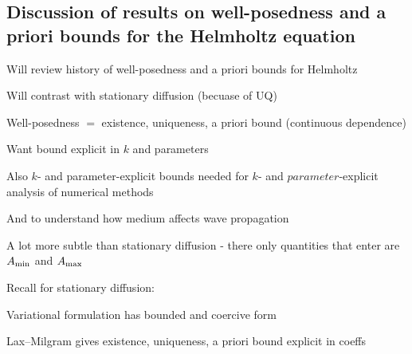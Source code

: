 \subsection{Discussion of results on well-posedness and a priori bounds for the Helmholtz equation}
\bit
\item Will review history of well-posedness and a priori bounds for Helmholtz
\item Will contrast with stationary diffusion (becuase of UQ)
  \eit

  \bit
\item Well-posedness $=$ existence, uniqueness, a priori bound (continuous dependence)
\item Want bound explicit in $k$ and parameters
  \item Also $k$- and parameter-explicit bounds needed for $k$- and $parameter$-explicit analysis of numerical methods
  \item And to understand how medium affects wave propagation
    \item A lot more subtle than stationary diffusion - there only quantities that enter are $A_{\min}$ and $A_{\max}$
  \eit

Recall for stationary diffusion:
\bit
\item Variational formulation has bounded and coercive form
\item Lax--Milgram gives existence, uniqueness, a priori bound explicit in coeffs
\eit
  
